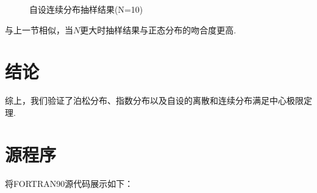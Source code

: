 \documentclass[12pt,a4paper,utf8]{ctexart}
\begin{document}
\begin{figure}[htb]
    \centering
    \hfill
    \hfill
    \hfill
    \caption{自设连续分布抽样结果(N=10)}
\end{figure}

与上一节相似，当$N$更大时抽样结果与正态分布的吻合度更高.
\newpage
\section{结论}

综上，我们验证了泊松分布、指数分布以及自设的离散和连续分布满足中心极限定理.

\section{源程序}
将FORTRAN90源代码展示如下：
\end{document}
